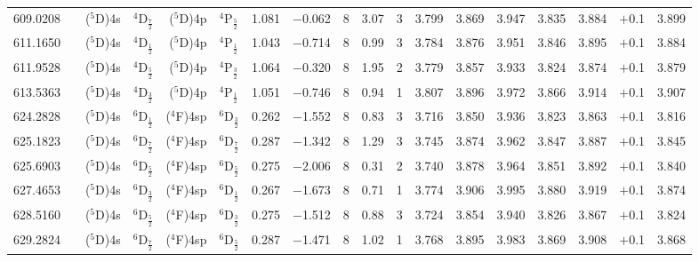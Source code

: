 \documentclass[traditabstract]{aa}
\newcommand{\pst}{\phantom{*}}
\newcommand{\phz}{\phantom{0}}
\begin{document}
\begin{center}
\begin{mpsupertabular}{r@{}c@{\ \ \ }r@{~}l@{\ }r@{~}l@{\ \ \ }c@{\ \ \ }c@{\ \ \ }c@{\ \ \ }c@{\ \ \ }c@{\ \ \ }c@{\ \ \ }c@{\ \ \ }c@{\ \ \ }c@{\ \ \ }c@{\ \ \ }r@{\ \ \ }c}
609.0208 & &  \footnotesize ($^5$D)4s&\footnotesize$^4$D$_\frac{7}{2}$   &\footnotesize ($^5$D)4p &\footnotesize$^4$P$_\frac{5}{2}$   & 1.081 & $-$0.062 & 8  & 3.07 & 3\pst      & 3.799 & 3.869 & 3.947 & 3.835 & 3.884 & \phz$+$0.1\phz & 3.899 \\  
611.1650 & &  \footnotesize ($^5$D)4s&\footnotesize$^4$D$_\frac{1}{2}$   &\footnotesize ($^5$D)4p &\footnotesize$^4$P$_\frac{1}{2}$   & 1.043 & $-$0.714 & 8  & 0.99 & 3\pst      & 3.784 & 3.876 & 3.951 & 3.846 & 3.895 & \phz$+$0.1\phz & 3.884 \\  
611.9528 & &  \footnotesize ($^5$D)4s&\footnotesize$^4$D$_\frac{5}{2}$   &\footnotesize ($^5$D)4p &\footnotesize$^4$P$_\frac{3}{2}$   & 1.064 & $-$0.320 & 8  & 1.95 & 2\pst      & 3.779 & 3.857 & 3.933 & 3.824 & 3.874 & \phz$+$0.1\phz & 3.879 \\  
613.5363 & &  \footnotesize ($^5$D)4s&\footnotesize$^4$D$_\frac{3}{2}$   &\footnotesize ($^5$D)4p &\footnotesize$^4$P$_\frac{1}{2}$   & 1.051 & $-$0.746 & 8  & 0.94 & 1\pst      & 3.807 & 3.896 & 3.972 & 3.866 & 3.914 & \phz$+$0.1\phz & 3.907 \\  
624.2828 & &  \footnotesize ($^5$D)4s&\footnotesize$^6$D$_\frac{1}{2}$   &\footnotesize ($^4$F)4sp&\footnotesize$^6$D$_\frac{3}{2}$   & 0.262 & $-$1.552 & 8  & 0.83 & 3\pst      & 3.716 & 3.850 & 3.936 & 3.823 & 3.863 & \phz$+$0.1\phz & 3.816 \\ 
625.1823 & &  \footnotesize ($^5$D)4s&\footnotesize$^6$D$_\frac{7}{2}$   &\footnotesize ($^4$F)4sp&\footnotesize$^6$D$_\frac{7}{2}$   & 0.287 & $-$1.342 & 8  & 1.29 & 3\pst      & 3.745 & 3.874 & 3.962 & 3.847 & 3.887 & \phz$+$0.1\phz & 3.845 \\  
625.6903 & &  \footnotesize ($^5$D)4s&\footnotesize$^6$D$_\frac{5}{2}$   &\footnotesize ($^4$F)4sp&\footnotesize$^6$D$_\frac{5}{2}$   & 0.275 & $-$2.006 & 8  & 0.31 & 2\pst      & 3.740 & 3.878 & 3.964 & 3.851 & 3.892 & \phz$+$0.1\phz & 3.840 \\  
627.4653 & &  \footnotesize ($^5$D)4s&\footnotesize$^6$D$_\frac{3}{2}$   &\footnotesize ($^4$F)4sp&\footnotesize$^6$D$_\frac{1}{2}$   & 0.267 & $-$1.673 & 8  & 0.71 & 1\pst      & 3.774 & 3.906 & 3.995 & 3.880 & 3.919 & \phz$+$0.1\phz & 3.874 \\  
628.5160 & &  \footnotesize ($^5$D)4s&\footnotesize$^6$D$_\frac{5}{2}$   &\footnotesize ($^4$F)4sp&\footnotesize$^6$D$_\frac{3}{2}$   & 0.275 & $-$1.512 & 8  & 0.88 & 3\pst      & 3.724 & 3.854 & 3.940 & 3.826 & 3.867 & \phz$+$0.1\phz & 3.824 \\  
629.2824 & &  \footnotesize ($^5$D)4s&\footnotesize$^6$D$_\frac{7}{2}$   &\footnotesize ($^4$F)4sp&\footnotesize$^6$D$_\frac{5}{2}$   & 0.287 & $-$1.471 & 8  & 1.02 & 1\pst      & 3.768 & 3.895 & 3.983 & 3.869 & 3.908 & \phz$+$0.1\phz & 3.868 \\ 

\end{mpsupertabular}
\end{center}
\end{document}
